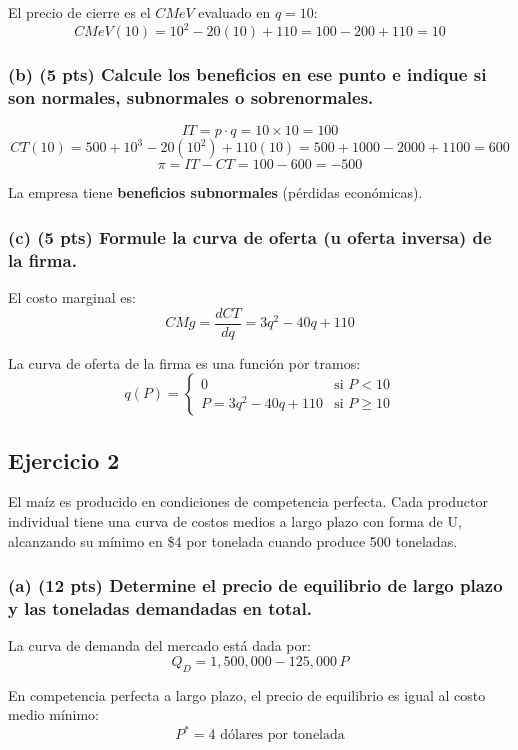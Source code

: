 \documentclass[12pt,letterpaper]{article}
\begin{document}
El precio de cierre es el $CMeV$ evaluado en $q = 10$:
\[
CMeV(10) = 10^2 - 20(10) + 110 = 100 - 200 + 110 = \boxed{10}
\]

\subsubsection*{(b) (5 pts) Calcule los beneficios en ese punto e indique si son normales, subnormales o sobrenormales.}

\[
IT = p \cdot q = 10 \times 10 = 100
\]
\[
CT(10) = 500 + 10^3 - 20(10^2) + 110(10) = 500 + 1000 - 2000 + 1100 = 600
\]
\[
\pi = IT - CT = 100 - 600 = -500
\]

La empresa tiene \textbf{beneficios subnormales} (pérdidas económicas).

\subsubsection*{(c) (5 pts) Formule la curva de oferta (u oferta inversa) de la firma.}

El costo marginal es:
\[
CMg = \frac{dCT}{dq} = 3q^2 - 40q + 110
\]

La curva de oferta de la firma es una función por tramos:
\[
q(P) = \begin{cases} 0 & \text{si } P < 10 \\ P = 3q^2 - 40q + 110 & \text{si } P \geq 10 \end{cases}
\]

\subsection*{Ejercicio 2}

El maíz es producido en condiciones de competencia perfecta. Cada productor individual tiene una curva de costos medios a largo plazo con forma de U, alcanzando su mínimo en \$4 por tonelada cuando produce 500 toneladas.

\subsubsection*{(a) (12 pts) Determine el precio de equilibrio de largo plazo y las toneladas demandadas en total.}

La curva de demanda del mercado está dada por:
\[
Q_D = 1{,}500{,}000 - 125{,}000\,P
\]

En competencia perfecta a largo plazo, el precio de equilibrio es igual al costo medio mínimo:
\[
P^* = 4 \text{ dólares por tonelada}
\]
\end{document}
